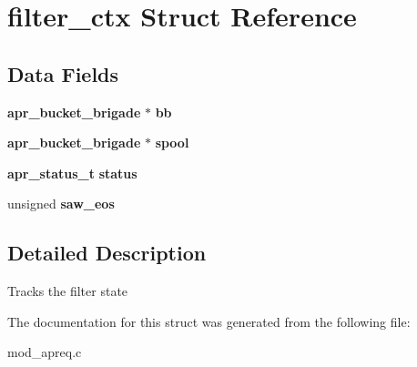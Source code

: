 \section{filter\_\-ctx Struct Reference}
\label{structfilter__ctx}
\subsection*{Data Fields}
\begin{CompactItemize}
\item 
{\bf apr\_\-bucket\_\-brigade} $\ast$ {\bf bb}\label{structfilter__ctx_m0}

\item 
{\bf apr\_\-bucket\_\-brigade} $\ast$ {\bf spool}\label{structfilter__ctx_m1}

\item 
{\bf apr\_\-status\_\-t} {\bf status}\label{structfilter__ctx_m2}

\item 
unsigned {\bf saw\_\-eos}\label{structfilter__ctx_m3}

\end{CompactItemize}


\subsection{Detailed Description}
Tracks the filter state 



The documentation for this struct was generated from the following file:\begin{CompactItemize}
\item 
mod\_\-apreq.c\end{CompactItemize}
